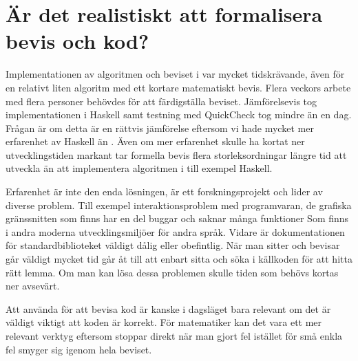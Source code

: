 \section{Är det realistiskt att formalisera bevis och kod?}
Implementationen av algoritmen och beviset i \coq var mycket tidskrävande, även
för en relativt liten algoritm med ett kortare matematiskt bevis. Flera veckors
arbete med flera personer behövdes för att färdigställa beviset. Jämförelsevis
tog implementationen i Haskell samt testning med QuickCheck tog mindre än en
dag. Frågan är om detta är en rättvis jämförelse eftersom vi hade mycket mer
erfarenhet av Haskell än \coq. Även om mer erfarenhet skulle ha kortat ner
utvecklingstiden markant tar formella bevis flera storleksordningar längre tid
att utveckla än att implementera algoritmen i till exempel Haskell.

Erfarenhet är inte den enda lösningen, \coq är ett forskningsprojekt och lider
av diverse problem. Till exempel interaktionsproblem med programvaran, de
grafiska gränssnitten som finns har en del buggar och saknar många funktioner
Som finns i andra moderna utvecklingsmiljöer för andra språk. Vidare är
dokumentationen för standardbiblioteket väldigt dålig eller obefintlig. När man
sitter och bevisar går väldigt mycket tid går åt till att enbart sitta och söka
i källkoden för att hitta rätt lemma. Om man kan lösa dessa problemen skulle
tiden som behövs kortas ner avsevärt.

Att använda \coq för att bevisa kod är kanske i dagsläget bara relevant om det
är väldigt viktigt att koden är korrekt. För matematiker kan det vara ett mer
relevant verktyg eftersom \coq stoppar direkt när man gjort fel istället för små
enkla fel smyger sig igenom hela beviset.
